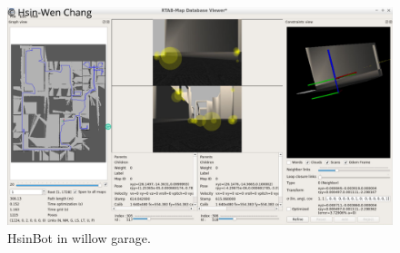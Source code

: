 \documentclass[10pt,journal,compsoc]{IEEEtran}
\begin{document}
\begin{figure}[thpb]
      \centering
      \includegraphics[width=\linewidth]{willowDBViewer.png}
      \caption{HsinBot in willow garage.}
      \label{fig:robot1}
\end{figure}
\end{document}
